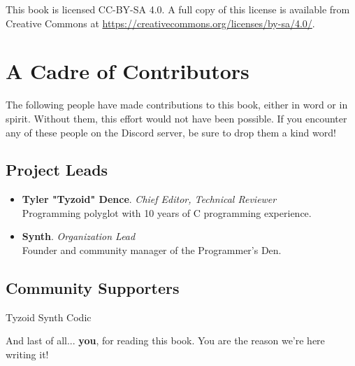 \documentclass[../main.tex]{subfiles}
\begin{document}
\vfill
This book is licensed CC-BY-SA 4.0. A full copy of this license is available
from Creative Commons at \url{https://creativecommons.org/licenses/by-sa/4.0/}.


\newpage
\section{A Cadre of Contributors}
The following people have made contributions to this book, either in word
or in spirit. Without them, this effort would not have been possible. If you
encounter any of these people on the Discord server, be sure to drop them a
kind word!

\vspace{1cm}

\subsection{Project Leads}
\begin{itemize}
	\item \textbf{Tyler "Tyzoid" Dence}. \textit{Chief Editor, Technical Reviewer}\\
		Programming polyglot with 10 years of C programming experience.
	
	\item \textbf{Synth}. \textit{Organization Lead}\\
		Founder and community manager of the Programmer's Den.
\end{itemize}

\vspace{2cm}


\subsection{Community Supporters}
\begin{center}
Tyzoid \csp
Synth \csp
Codic \csp
\end{center}

\vfill
And last of all... \textbf{you}, for reading this book. You are the reason we're
here writing it!
\end{document}
